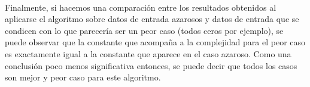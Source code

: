 \paragraph{}
Finalmente, si hacemos una comparación entre los resultados obtenidos al aplicarse el algoritmo sobre datos de entrada azarosos y datos de entrada que se condicen con lo que parecería ser un peor caso (todos ceros por ejemplo), se puede observar que la constante que acompaña a la complejidad para el peor caso es exactamente igual a la constante que aparece en el caso azaroso. Como una conclusión poco menos significativa entonces, se puede decir que todos los casos son mejor y peor caso para este algoritmo.

